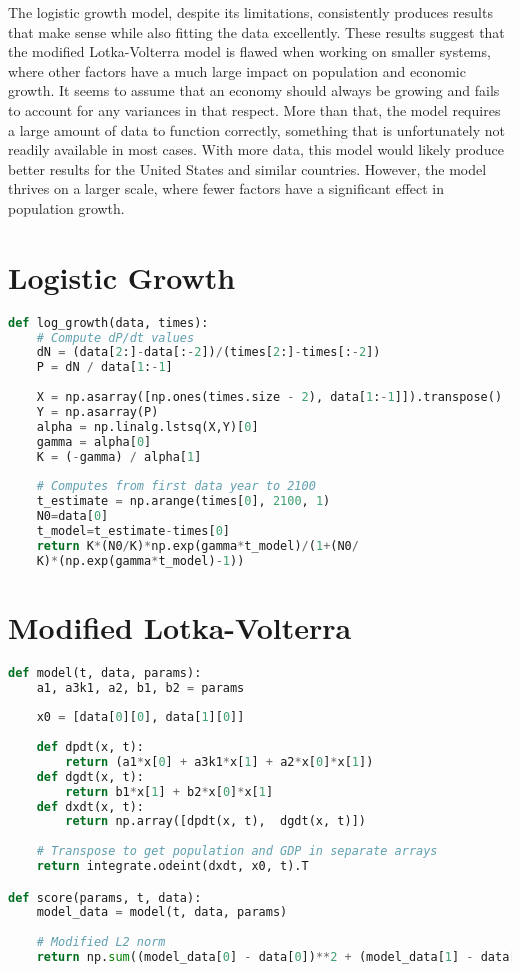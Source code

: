 \documentclass[a4paper]{article}
\begin{document}
The logistic growth model, despite its limitations, consistently produces results that make sense while also fitting the data excellently. These results suggest that the modified Lotka-Volterra model is flawed when working on smaller systems, where other factors have a much large impact on population and economic growth. It seems to assume that an economy should always be growing and fails to account for any variances in that respect. More than that, the model requires a large amount of data to function correctly, something that is unfortunately not readily available in most cases. With more data, this model would likely produce better results for the United States and similar countries. However, the model thrives on a larger scale, where fewer factors have a significant effect in population growth.

\newpage

\begin{appendices}

\section{Logistic Growth}

\begin{lstlisting}[language=Python]
def log_growth(data, times):
    # Compute dP/dt values
    dN = (data[2:]-data[:-2])/(times[2:]-times[:-2])
    P = dN / data[1:-1]
    
    X = np.asarray([np.ones(times.size - 2), data[1:-1]]).transpose()
    Y = np.asarray(P)
    alpha = np.linalg.lstsq(X,Y)[0]
    gamma = alpha[0]
    K = (-gamma) / alpha[1]
   
    # Computes from first data year to 2100
    t_estimate = np.arange(times[0], 2100, 1)
    N0=data[0]
    t_model=t_estimate-times[0]
    return K*(N0/K)*np.exp(gamma*t_model)/(1+(N0/
    K)*(np.exp(gamma*t_model)-1))
\end{lstlisting}

\section{Modified Lotka-Volterra}

\begin{lstlisting}[language=Python]
def model(t, data, params):   
    a1, a3k1, a2, b1, b2 = params
    
    x0 = [data[0][0], data[1][0]]
    
    def dpdt(x, t):
        return (a1*x[0] + a3k1*x[1] + a2*x[0]*x[1])
    def dgdt(x, t):
        return b1*x[1] + b2*x[0]*x[1]
    def dxdt(x, t):
        return np.array([dpdt(x, t),  dgdt(x, t)])
    
    # Transpose to get population and GDP in separate arrays
    return integrate.odeint(dxdt, x0, t).T 

def score(params, t, data):
    model_data = model(t, data, params)
    
    # Modified L2 norm
    return np.sum((model_data[0] - data[0])**2 + (model_data[1] - data[1])**2) 
\end{lstlisting}

\end{appendices}

\newpage

\nocite{*}


\end{document}
